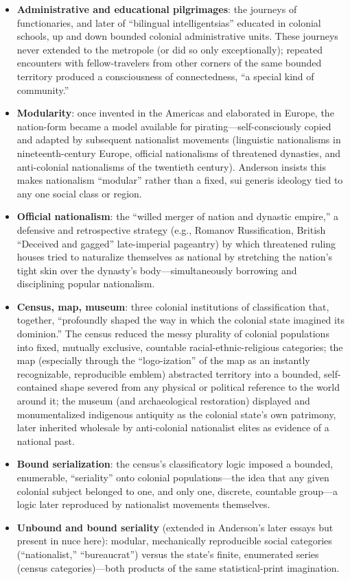 \documentclass[12pt]{article}
\begin{document}
\begin{itemize}[leftmargin=*, itemsep=4pt]
    \item \textbf{Administrative and educational pilgrimages}: the journeys of functionaries, and later of ``bilingual intelligentsias'' educated in colonial schools, up and down bounded colonial administrative units. These journeys never extended to the metropole (or did so only exceptionally); repeated encounters with fellow-travelers from other corners of the same bounded territory produced a consciousness of connectedness, ``a special kind of community.''
    \item \textbf{Modularity}: once invented in the Americas and elaborated in Europe, the nation-form became a model available for pirating---self-consciously copied and adapted by subsequent nationalist movements (linguistic nationalisms in nineteenth-century Europe, official nationalisms of threatened dynasties, and anti-colonial nationalisms of the twentieth century). Anderson insists this makes nationalism ``modular'' rather than a fixed, sui generis ideology tied to any one social class or region.
    \item \textbf{Official nationalism}: the ``willed merger of nation and dynastic empire,'' a defensive and retrospective strategy (e.g., Romanov Russification, British ``Deceived and gagged'' late-imperial pageantry) by which threatened ruling houses tried to naturalize themselves as national by stretching the nation's tight skin over the dynasty's body---simultaneously borrowing and disciplining popular nationalism.
    \item \textbf{Census, map, museum}: three colonial institutions of classification that, together, ``profoundly shaped the way in which the colonial state imagined its dominion.'' The census reduced the messy plurality of colonial populations into fixed, mutually exclusive, countable racial-ethnic-religious categories; the map (especially through the ``logo-ization'' of the map as an instantly recognizable, reproducible emblem) abstracted territory into a bounded, self-contained shape severed from any physical or political reference to the world around it; the museum (and archaeological restoration) displayed and monumentalized indigenous antiquity as the colonial state's own patrimony, later inherited wholesale by anti-colonial nationalist elites as evidence of a national past.
    \item \textbf{Bound serialization}: the census's classificatory logic imposed a bounded, enumerable, ``seriality'' onto colonial populations---the idea that any given colonial subject belonged to one, and only one, discrete, countable group---a logic later reproduced by nationalist movements themselves.
    \item \textbf{Unbound and bound seriality} (extended in Anderson's later essays but present in nuce here): modular, mechanically reproducible social categories (``nationalist,'' ``bureaucrat'') versus the state's finite, enumerated series (census categories)---both products of the same statistical-print imagination.
\end{itemize}
\end{document}
